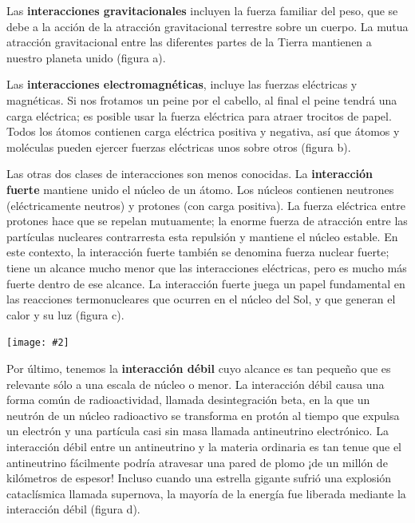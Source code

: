\documentclass{article}
\newcommand{\bl}[1]{\textbf{#1}}
\newcommand{\ladoALado}[4]{
    \begin{minipage}[t]{#3\textwidth}
        \vspace{0pt}
        #1
    \end{minipage}
    \hfill
    \begin{minipage}[t]{#4\textwidth}
        \vspace{0pt}
        \centering
        \texttt{[image: \#2]}
    \end{minipage}
}
\begin{document}
    \ladoALado{
        \par Las \bl{interacciones gravitacionales} incluyen la fuerza familiar del peso, que se debe a la acción de la atracción gravitacional terrestre sobre un cuerpo. La mutua atracción gravitacional entre las diferentes partes de la Tierra mantienen a nuestro planeta unido (figura a).

        \vspace{0.2cm}

        \par Las \bl{interacciones electromagnéticas}, incluye las fuerzas eléctricas y magnéticas. Si nos frotamos un peine por el cabello, al final el peine tendrá una carga eléctrica; es posible usar la fuerza eléctrica para atraer trocitos de papel. Todos los átomos contienen carga eléctrica positiva y negativa, así que átomos y moléculas pueden ejercer fuerzas eléctricas unos sobre otros (figura b).

        \vspace{0.2cm}

        \par Las otras dos clases de interacciones son menos conocidas. La \bl{interacción fuerte} mantiene unido el núcleo de un átomo. Los núcleos contienen neutrones (eléctricamente neutros) y protones (con carga positiva). La fuerza eléctrica entre protones hace que se repelan mutuamente; la enorme fuerza de atracción entre las partículas nucleares contrarresta esta repulsión y mantiene el núcleo estable. En este contexto, la interacción fuerte también se denomina fuerza nuclear fuerte; tiene un alcance mucho menor que las interacciones eléctricas, pero es mucho más fuerte dentro de ese alcance. La interacción fuerte juega un papel fundamental en las reacciones termonucleares que ocurren en el núcleo del Sol, y que generan el calor y su luz (figura c).

        \vspace{0.2cm}

        
    }{img/3.3-9.png}{0.6}{0.33}
    \par Por último, tenemos la \bl{interacción débil} cuyo alcance es tan pequeño que es relevante sólo a una escala de núcleo o menor. La interacción débil causa una forma común de radioactividad, llamada desintegración beta, en la que un neutrón de un núcleo radioactivo se transforma en protón al tiempo que expulsa un electrón y una partícula casi sin masa llamada antineutrino electrónico. La interacción débil entre un antineutrino y la materia ordinaria es tan tenue que el antineutrino fácilmente podría atravesar una pared de plomo ¡de un millón de kilómetros de espesor! Incluso cuando una estrella gigante sufrió una explosión cataclísmica llamada supernova, la mayoría de la energía fue liberada mediante la interacción débil (figura d).
\end{document}
